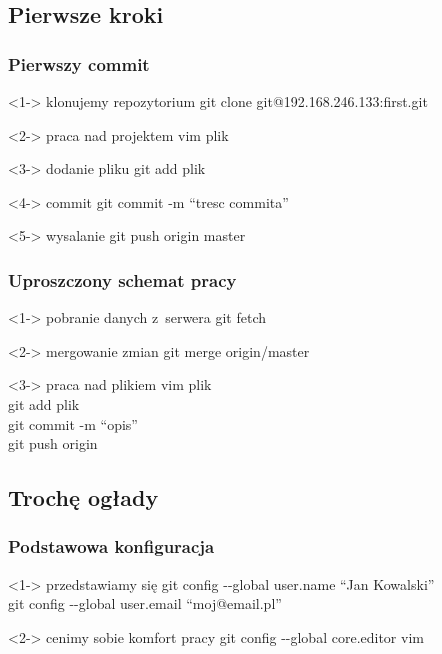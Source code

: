 \documentclass[10pt]{beamer}
\begin{document}
\subsection{Pierwsze kroki}
\begin{frame}
	\frametitle{Pierwszy commit}	
	\begin{block}<1->
	{klonujemy repozytorium}
		git clone git@192.168.246.133:first.git
	\end{block}
	\begin{block}<2->
	{praca nad projektem}
	vim plik 
	\end{block}
	\begin{block}<3->
	{dodanie pliku}
	git add plik
	\end{block}
	\begin{block}<4->
	{commit}
	git commit -m ``tresc commita''
	\end{block}
	\begin{block}<5->
	{wysalanie}
	git push origin master
	\end{block}
\end{frame}
\begin{frame}
	\frametitle{Uproszczony schemat pracy}
	\begin{block}<1->
	{pobranie danych z~serwera}
	git fetch
	\end{block}
	\begin{block}<2->
	{mergowanie zmian}
	git merge origin/master
	\end{block}
	\begin{block}<3->
	{praca nad plikiem}
	vim plik\\
	git add plik\\
	git commit -m ``opis''\\
	git push origin
	\end{block}
\end{frame}
\subsection{Trochę ogłady}
\begin{frame}
	\frametitle{Podstawowa konfiguracja}
	\begin{block}<1->
	{przedstawiamy się}
	git config -{}-global user.name ``Jan Kowalski''\\
	git config -{}-global user.email ``moj@email.pl''
	\end{block}
	\begin{block}<2->
	{cenimy sobie komfort pracy}
	git config -{}-global core.editor vim
	\end{block}
\end{frame}
\end{document}
